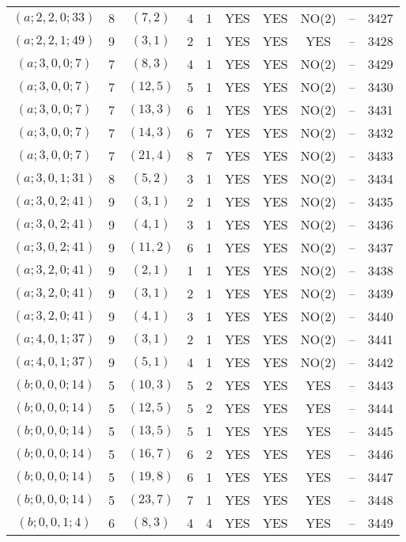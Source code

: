 \begin{longtable}{|c|c|c|c|c|c|c|c|c|c|}
$(a; 2, 2, 0; 33)$ & 8 & $(7, 2)$ & 4 & 1 & YES & YES & NO(2) & -- & 3427\\
$(a; 2, 2, 1; 49)$ & 9 & $(3, 1)$ & 2 & 1 & YES & YES & YES & -- & 3428\\
$(a; 3, 0, 0; 7)$ & 7 & $(8, 3)$ & 4 & 1 & YES & YES & NO(2) & -- & 3429\\
$(a; 3, 0, 0; 7)$ & 7 & $(12, 5)$ & 5 & 1 & YES & YES & NO(2) & -- & 3430\\
$(a; 3, 0, 0; 7)$ & 7 & $(13, 3)$ & 6 & 1 & YES & YES & NO(2) & -- & 3431\\
$(a; 3, 0, 0; 7)$ & 7 & $(14, 3)$ & 6 & 7 & YES & YES & NO(2) & -- & 3432\\
$(a; 3, 0, 0; 7)$ & 7 & $(21, 4)$ & 8 & 7 & YES & YES & NO(2) & -- & 3433\\
$(a; 3, 0, 1; 31)$ & 8 & $(5, 2)$ & 3 & 1 & YES & YES & NO(2) & -- & 3434\\
$(a; 3, 0, 2; 41)$ & 9 & $(3, 1)$ & 2 & 1 & YES & YES & NO(2) & -- & 3435\\
$(a; 3, 0, 2; 41)$ & 9 & $(4, 1)$ & 3 & 1 & YES & YES & NO(2) & -- & 3436\\
$(a; 3, 0, 2; 41)$ & 9 & $(11, 2)$ & 6 & 1 & YES & YES & NO(2) & -- & 3437\\
$(a; 3, 2, 0; 41)$ & 9 & $(2, 1)$ & 1 & 1 & YES & YES & NO(2) & -- & 3438\\
$(a; 3, 2, 0; 41)$ & 9 & $(3, 1)$ & 2 & 1 & YES & YES & NO(2) & -- & 3439\\
$(a; 3, 2, 0; 41)$ & 9 & $(4, 1)$ & 3 & 1 & YES & YES & NO(2) & -- & 3440\\
$(a; 4, 0, 1; 37)$ & 9 & $(3, 1)$ & 2 & 1 & YES & YES & NO(2) & -- & 3441\\
$(a; 4, 0, 1; 37)$ & 9 & $(5, 1)$ & 4 & 1 & YES & YES & NO(2) & -- & 3442\\
$(b; 0, 0, 0; 14)$ & 5 & $(10, 3)$ & 5 & 2 & YES & YES & YES & -- & 3443\\
$(b; 0, 0, 0; 14)$ & 5 & $(12, 5)$ & 5 & 2 & YES & YES & YES & -- & 3444\\
$(b; 0, 0, 0; 14)$ & 5 & $(13, 5)$ & 5 & 1 & YES & YES & YES & -- & 3445\\
$(b; 0, 0, 0; 14)$ & 5 & $(16, 7)$ & 6 & 2 & YES & YES & YES & -- & 3446\\
$(b; 0, 0, 0; 14)$ & 5 & $(19, 8)$ & 6 & 1 & YES & YES & YES & -- & 3447\\
$(b; 0, 0, 0; 14)$ & 5 & $(23, 7)$ & 7 & 1 & YES & YES & YES & -- & 3448\\
$(b; 0, 0, 1; 4)$ & 6 & $(8, 3)$ & 4 & 4 & YES & YES & YES & -- & 3449\\

\end{longtable}
